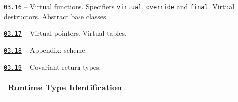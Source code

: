 \documentclass[a4paper,12pt]{article}
\renewenvironment{itemize}
{
    \begin{list}{\labelitemi}
    {
      \setlength{\topsep}{0pt}
      \setlength{\partopsep}{0pt}
      \setlength{\parskip}{0pt}
      \setlength{\itemsep}{0pt}
      \setlength{\parsep}{0pt}
      \setlength{\leftmargin}{14.5pt}
    }
}{\end{list}}
\begin{document}
\begin{itemize}

    \item \href{https://github.com/i-s-m-mipt/Education/blob/master/projects/examples/source/03.16.cpp}{\texttt{03.16}} -- Virtual functions. Specifiers \lstinline{virtual}, \lstinline{override} and \lstinline{final}. Virtual destructors. Abstract base classes.

    \smallskip

    \item \href{https://github.com/i-s-m-mipt/Education/blob/master/projects/examples/source/03.17.cpp}{\texttt{03.17}} -- Virtual pointers. Virtual tables.

    \smallskip

    \item \href{https://github.com/i-s-m-mipt/Education/blob/master/projects/examples/source/03.18.pdf}{\texttt{03.18}} -- Appendix: scheme.

    \smallskip

    \item \href{https://github.com/i-s-m-mipt/Education/blob/master/projects/examples/source/03.19.cpp}{\texttt{03.19}} -- Covariant return types.

\end{itemize}

\bigskip\medskip

\begin{tabular}{!{\vrule width 1pt}L{5.5cm}!{\vrule width 1pt}L{13.5cm}!{\vrule width 0pt}} 


\textbf{Runtime Type Identification} & \\


\end{tabular}

\medskip\smallskip
\end{document}
